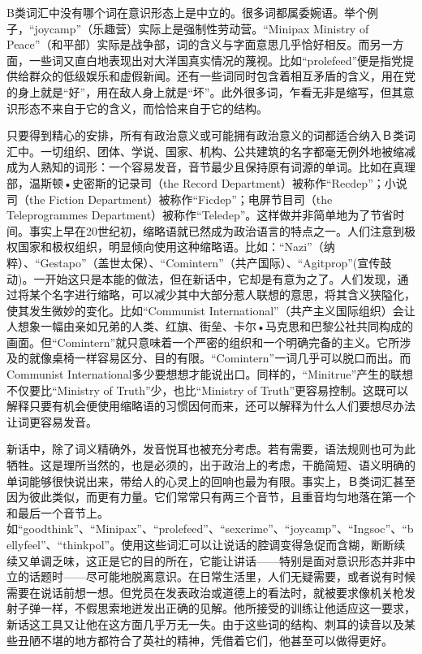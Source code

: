 B类词汇中没有哪个词在意识形态上是中立的。很多词都属委婉语。举个例子，``joycamp''（乐趣营）实际上是强制性劳动营。``Minipax
Ministry of
Peace''（和平部）实际是战争部，词的含义与字面意思几乎恰好相反。而另一方面，一些词又直白地表现出对大洋国真实情况的蔑视。比如``prolefeed''便是指党提供给群众的低级娱乐和虚假新闻。还有一些词同时包含着相互矛盾的含义，用在党的身上就是``好''，用在敌人身上就是``坏''。此外很多词，乍看无非是缩写，但其意识形态不来自于它的含义，而恰恰来自于它的结构。

只要得到精心的安排，所有有政治意义或可能拥有政治意义的词都适合纳入Ｂ类词汇中。一切组织、团体、学说、国家、机构、公共建筑的名字都毫无例外地被缩减成为人熟知的词形：一个容易发音，音节最少且保持原有词源的单词。比如在真理部，温斯顿•史密斯的记录司（the
Record Department）被称作``Recdep''；小说司（the Fiction
Department）被称作``Ficdep''；电屏节目司（the Teleprogrammes
Department）被称作``Teledep''。这样做并非简单地为了节省时间。事实上早在20世纪初，缩略语就已然成为政治语言的特点之一。人们注意到极权国家和极权组织，明显倾向使用这种缩略语。比如：``Nazi''（纳粹）、``Gestapo''（盖世太保）、``Comintern''（共产国际）、``Agitprop''(宣传鼓动)。一开始这只是本能的做法，但在新话中，它却是有意为之了。人们发现，通过将某个名字进行缩略，可以减少其中大部分惹人联想的意思，将其含义狭隘化，使其发生微妙的变化。比如``Communist
International''（共产主义国际组织）会让人想象一幅由亲如兄弟的人类、红旗、街垒、卡尔•马克思和巴黎公社共同构成的画面。但``Comintern''就只意味着一个严密的组织和一个明确完备的主义。它所涉及的就像桌椅一样容易区分、目的有限。``Comintern''一词几乎可以脱口而出。而Communist
International多少要想想才能说出口。同样的，``Minitrue''产生的联想不仅要比``Ministry
of Truth''少，也比``Ministry of
Truth''更容易控制。这既可以解释只要有机会便使用缩略语的习惯因何而来，还可以解释为什么人们要想尽办法让词更容易发音。

新话中，除了词义精确外，发音悦耳也被充分考虑。若有需要，语法规则也可为此牺牲。这是理所当然的，也是必须的，出于政治上的考虑，干脆简短、语义明确的单词能够很快说出来，带给人的心灵上的回响也最为有限。事实上，Ｂ类词汇甚至因为彼此类似，而更有力量。它们常常只有两三个音节，且重音均匀地落在第一个和最后一个音节上。如``goodthink''、``Minipax''、``prolefeed''、``sexcrime''、``joycamp''、``Ingsoc''、``bellyfeel''、``thinkpol''。使用这些词汇可以让说话的腔调变得急促而含糊，断断续续又单调乏味，这正是它的目的所在，它能让讲话——特别是面对意识形态并非中立的话题时——尽可能地脱离意识。在日常生活里，人们无疑需要，或者说有时候需要在说话前想一想。但党员在发表政治或道德上的看法时，就被要求像机关枪发射子弹一样，不假思索地迸发出正确的见解。他所接受的训练让他适应这一要求，新话这工具又让他在这方面几乎万无一失。由于这些词的结构、刺耳的读音以及某些丑陋不堪的地方都符合了英社的精神，凭借着它们，他甚至可以做得更好。


